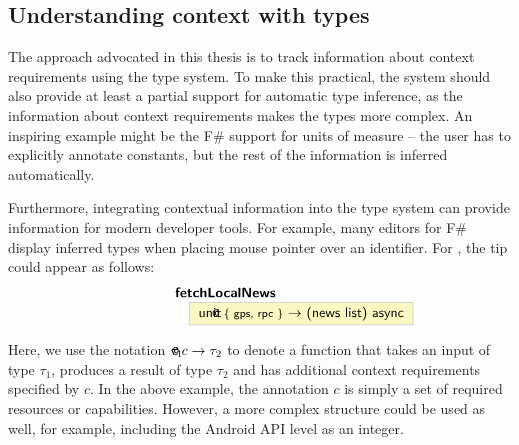 
\newcommand{\introfuncblack}[3]{ \ident{#1 \hspace{-1em}\footnotesize{@} \{ #2 \}} $\rightarrow$ \ident{#3}  }
\newcommand{\introfunc}[3]{ \ident{#1 \hspace{-1em}\footnotesize{@} \aclrd{\{ #2 \}}} $\rightarrow$ \ident{#3}  }
\newcommand{\introvar}[2]{ \ident{#1 \hspace{-1em}\footnotesize{@} \cclrd{#2} } }


\subsection{Understanding context with types}

The approach advocated in this thesis is to track information about context requirements using
the type system. To make this practical, the system should also provide at least a partial support for
automatic type inference, as the information about context requirements makes the types more complex.
An inspiring example might be the F\# support for units of measure \cite{app-units} -- the user has
to explicitly annotate constants, but the rest of the information is inferred automatically.

Furthermore, integrating contextual information into the type system can provide information for
modern developer tools. For example, many editors for F\# display inferred types when placing mouse
pointer over an identifier. For , the tip could appear as follows:
%
\vspace{0.5em}
\begin{equation*}
\hspace{5em}
\begin{array}{l}
\ident{\textbf{fetchLocalNews}}\\
\hspace{1em} \fcolorbox{tooltipb}{tooltipy}{
	\introfuncblack{unit}{gps, rpc}{(news~list)~async}
}
\end{array}
\end{equation*}
\vspace{0.5em}

\noindent
Here, we use the notation $\tau_1 \,\textnormal{\sffamily \hspace{-1em}\footnotesize{@}}\, c \rightarrow \tau_2$ to denote
a function that takes an input of type $\tau_1$, produces a result of type $\tau_2$ and has additional
context requirements specified by $c$. In the above example, the annotation $c$ is simply a set of
required resources or capabilities. However, a more complex structure could be used as well, for example,
including the Android API level as an integer.

